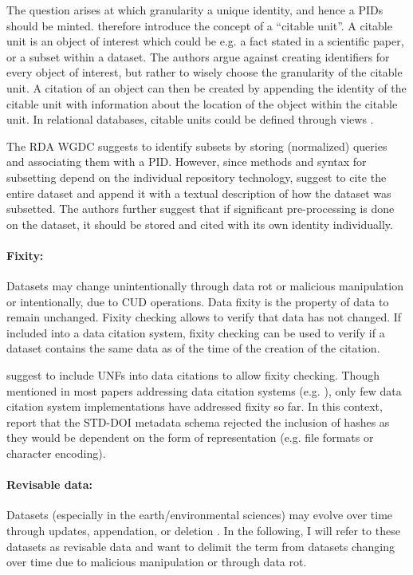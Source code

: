 \documentclass[a4paper,10pt]{article}
\begin{document}
The question arises at which granularity a unique identity, and hence a \glspl{PID} should be minted. \cite{Buneman2010} therefore introduce the concept of a ``citable unit''. A citable unit is an object of interest which could be e.g. a fact stated in a scientific paper, or a subset within a dataset. The authors argue against creating identifiers for every object of interest, but rather to wisely choose the granularity of the citable unit. A citation of an object can then be created by appending the identity of the citable unit with information about the location of the object within the citable unit. In relational databases, citable units could be defined through views \citep{Buneman2016}.

The \gls{RDA} \gls{WGDC} \citep{Rauber2015a, Rauber2015, Proll2013} suggests to identify subsets by storing (normalized) queries and associating them with a \gls{PID}. However, since methods and syntax for subsetting depend on the individual repository technology, \cite{AltKin07} suggest to cite the entire dataset and append it with a textual description of how the dataset was subsetted. The authors further suggest that if significant pre-processing is done on the dataset, it should be stored and cited with its own identity individually. 

\paragraph{Fixity:}
Datasets may change unintentionally through data rot or malicious manipulation or intentionally, due to \gls{CUD} operations. 
Data fixity is the property of data to remain unchanged. 
Fixity checking allows to verify that data has not changed.
If included into a data citation system, fixity checking can be used to verify if a dataset contains the same data as of the time of the creation of the citation.

\cite{AltKin07, Rauber2015} suggest to include \glspl{UNF} into data citations to allow fixity checking. Though mentioned in most papers addressing data citation systems (e.g. \citep{Buneman2016, Davidson2017}), only few data citation system implementations have addressed fixity so far. In this context, \cite{Klump2016} report that the STD-DOI metadata schema rejected the inclusion of hashes as they would be dependent on the form of representation (e.g. file formats or character encoding).

\paragraph{Revisable data:}
Datasets (especially in the earth/environmental sciences) may evolve over time through updates, appendation, or deletion \citep{Klump2016}. In the following, I will refer to these datasets as revisable data and want to delimit the term from datasets changing over time due to malicious manipulation or through data rot.
\end{document}
